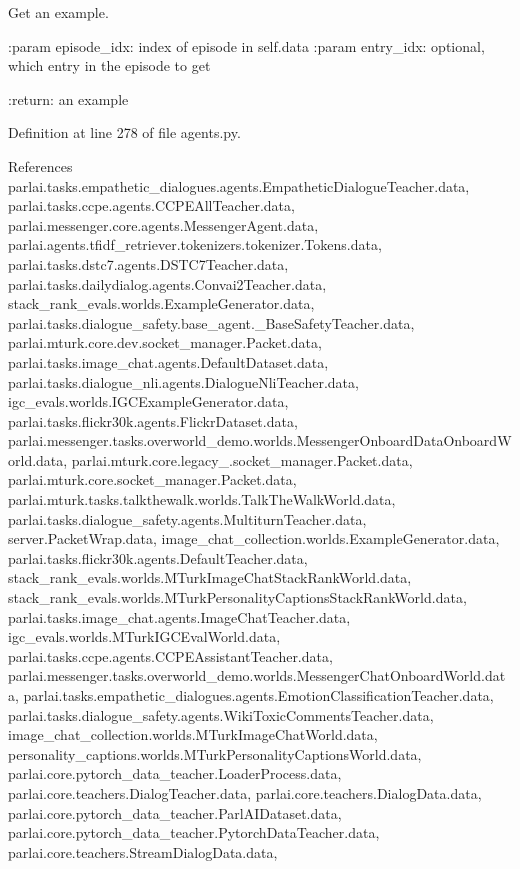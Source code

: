 \begin{DoxyVerb}Get an example.

:param episode_idx:
    index of episode in self.data
:param entry_idx:
    optional, which entry in the episode to get

:return:
    an example
\end{DoxyVerb}
 

Definition at line 278 of file agents.\+py.



References parlai.\+tasks.\+empathetic\+\_\+dialogues.\+agents.\+Empathetic\+Dialogue\+Teacher.\+data, parlai.\+tasks.\+ccpe.\+agents.\+C\+C\+P\+E\+All\+Teacher.\+data, parlai.\+messenger.\+core.\+agents.\+Messenger\+Agent.\+data, parlai.\+agents.\+tfidf\+\_\+retriever.\+tokenizers.\+tokenizer.\+Tokens.\+data, parlai.\+tasks.\+dstc7.\+agents.\+D\+S\+T\+C7\+Teacher.\+data, parlai.\+tasks.\+dailydialog.\+agents.\+Convai2\+Teacher.\+data, stack\+\_\+rank\+\_\+evals.\+worlds.\+Example\+Generator.\+data, parlai.\+tasks.\+dialogue\+\_\+safety.\+base\+\_\+agent.\+\_\+\+Base\+Safety\+Teacher.\+data, parlai.\+mturk.\+core.\+dev.\+socket\+\_\+manager.\+Packet.\+data, parlai.\+tasks.\+image\+\_\+chat.\+agents.\+Default\+Dataset.\+data, parlai.\+tasks.\+dialogue\+\_\+nli.\+agents.\+Dialogue\+Nli\+Teacher.\+data, igc\+\_\+evals.\+worlds.\+I\+G\+C\+Example\+Generator.\+data, parlai.\+tasks.\+flickr30k.\+agents.\+Flickr\+Dataset.\+data, parlai.\+messenger.\+tasks.\+overworld\+\_\+demo.\+worlds.\+Messenger\+Onboard\+Data\+Onboard\+World.\+data, parlai.\+mturk.\+core.\+legacy\+\_.\+socket\+\_\+manager.\+Packet.\+data, parlai.\+mturk.\+core.\+socket\+\_\+manager.\+Packet.\+data, parlai.\+mturk.\+tasks.\+talkthewalk.\+worlds.\+Talk\+The\+Walk\+World.\+data, parlai.\+tasks.\+dialogue\+\_\+safety.\+agents.\+Multiturn\+Teacher.\+data, server.\+Packet\+Wrap.\+data, image\+\_\+chat\+\_\+collection.\+worlds.\+Example\+Generator.\+data, parlai.\+tasks.\+flickr30k.\+agents.\+Default\+Teacher.\+data, stack\+\_\+rank\+\_\+evals.\+worlds.\+M\+Turk\+Image\+Chat\+Stack\+Rank\+World.\+data, stack\+\_\+rank\+\_\+evals.\+worlds.\+M\+Turk\+Personality\+Captions\+Stack\+Rank\+World.\+data, parlai.\+tasks.\+image\+\_\+chat.\+agents.\+Image\+Chat\+Teacher.\+data, igc\+\_\+evals.\+worlds.\+M\+Turk\+I\+G\+C\+Eval\+World.\+data, parlai.\+tasks.\+ccpe.\+agents.\+C\+C\+P\+E\+Assistant\+Teacher.\+data, parlai.\+messenger.\+tasks.\+overworld\+\_\+demo.\+worlds.\+Messenger\+Chat\+Onboard\+World.\+data, parlai.\+tasks.\+empathetic\+\_\+dialogues.\+agents.\+Emotion\+Classification\+Teacher.\+data, parlai.\+tasks.\+dialogue\+\_\+safety.\+agents.\+Wiki\+Toxic\+Comments\+Teacher.\+data, image\+\_\+chat\+\_\+collection.\+worlds.\+M\+Turk\+Image\+Chat\+World.\+data, personality\+\_\+captions.\+worlds.\+M\+Turk\+Personality\+Captions\+World.\+data, parlai.\+core.\+pytorch\+\_\+data\+\_\+teacher.\+Loader\+Process.\+data, parlai.\+core.\+teachers.\+Dialog\+Teacher.\+data, parlai.\+core.\+teachers.\+Dialog\+Data.\+data, parlai.\+core.\+pytorch\+\_\+data\+\_\+teacher.\+Parl\+A\+I\+Dataset.\+data, parlai.\+core.\+pytorch\+\_\+data\+\_\+teacher.\+Pytorch\+Data\+Teacher.\+data, parlai.\+core.\+teachers.\+Stream\+Dialog\+Data.\+data, 